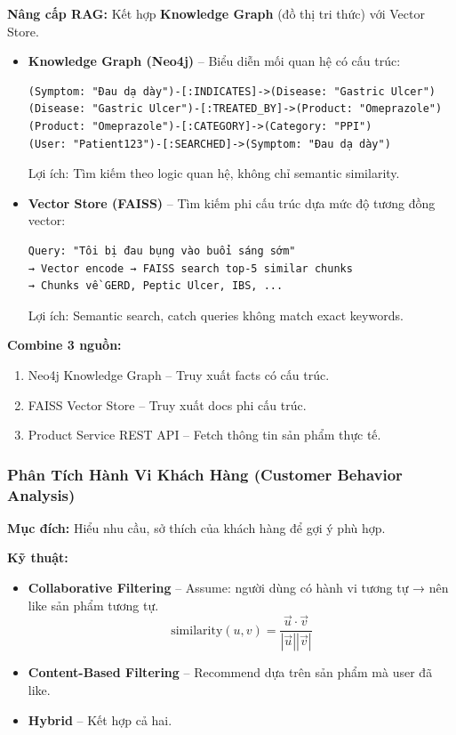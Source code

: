 \documentclass[12pt,a4paper]{article}
\begin{document}
\textbf{Nâng cấp RAG:} Kết hợp \textbf{Knowledge Graph} (đồ thị tri thức) với Vector Store.

\begin{itemize}
    \item \textbf{Knowledge Graph (Neo4j)} – Biểu diễn mối quan hệ có cấu trúc:
    \begin{verbatim}
(Symptom: "Đau dạ dày")-[:INDICATES]->(Disease: "Gastric Ulcer")
(Disease: "Gastric Ulcer")-[:TREATED_BY]->(Product: "Omeprazole")
(Product: "Omeprazole")-[:CATEGORY]->(Category: "PPI")
(User: "Patient123")-[:SEARCHED]->(Symptom: "Đau dạ dày")
    \end{verbatim}
    Lợi ích: Tìm kiếm theo logic quan hệ, không chỉ semantic similarity.
    
    \item \textbf{Vector Store (FAISS)} – Tìm kiếm phi cấu trúc dựa mức độ tương đồng vector:
    \begin{verbatim}
Query: "Tôi bị đau bụng vào buổi sáng sớm"
→ Vector encode → FAISS search top-5 similar chunks
→ Chunks về GERD, Peptic Ulcer, IBS, ...
    \end{verbatim}
    Lợi ích: Semantic search, catch queries không match exact keywords.
\end{itemize}

\textbf{Combine 3 nguồn:}
\begin{enumerate}
    \item Neo4j Knowledge Graph – Truy xuất facts có cấu trúc.
    \item FAISS Vector Store – Truy xuất docs phi cấu trúc.
    \item Product Service REST API – Fetch thông tin sản phẩm thực tế.
\end{enumerate}

\subsubsection{Phân Tích Hành Vi Khách Hàng (Customer Behavior Analysis)}

\textbf{Mục đích:} Hiểu nhu cầu, sở thích của khách hàng để gợi ý phù hợp.

\textbf{Kỹ thuật:}
\begin{itemize}
    \item \textbf{Collaborative Filtering} – Assume: người dùng có hành vi tương tự → nên like sản phẩm tương tự.
    \[ \text{similarity}(u, v) = \frac{\vec{u} \cdot \vec{v}}{|\vec{u}| |\vec{v}|} \]
    
    \item \textbf{Content-Based Filtering} – Recommend dựa trên sản phẩm mà user đã like.
    
    \item \textbf{Hybrid} – Kết hợp cả hai.
\end{itemize}
\end{document}

